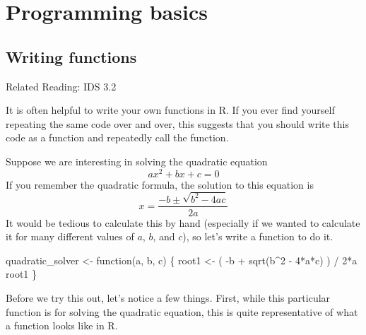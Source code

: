 \documentclass[
  letterpaper,
  DIV=11,
  numbers=noendperiod]{scrreprt}
\newenvironment{Shaded}{\begin{snugshade}}{\end{snugshade}}
\newcommand{\ControlFlowTok}[1]{\textcolor[rgb]{0.00,0.23,0.31}{#1}}
\newcommand{\DecValTok}[1]{\textcolor[rgb]{0.68,0.00,0.00}{#1}}
\newcommand{\FunctionTok}[1]{\textcolor[rgb]{0.28,0.35,0.67}{#1}}
\newcommand{\NormalTok}[1]{\textcolor[rgb]{0.00,0.23,0.31}{#1}}
\newcommand{\OtherTok}[1]{\textcolor[rgb]{0.00,0.23,0.31}{#1}}
\newcommand{\SpecialCharTok}[1]{\textcolor[rgb]{0.37,0.37,0.37}{#1}}
\begin{document}
\section{Programming basics}\label{programming-basics}

\subsection{Writing functions}\label{writing-functions}

Related Reading: IDS 3.2

It is often helpful to write your own functions in R. If you ever find
yourself repeating the same code over and over, this suggests that you
should write this code as a function and repeatedly call the function.

Suppose we are interesting in solving the quadratic equation \[
  ax^2 + bx + c = 0
\] If you remember the quadratic formula, the solution to this equation
is \[
  x = \frac{-b \pm \sqrt{b^2-4ac}}{2a}
\] It would be tedious to calculate this by hand (especially if we
wanted to calculate it for many different values of \(a\), \(b\), and
\(c\)), so let's write a function to do it.

\begin{Shaded}
\begin{Highlighting}[]
\NormalTok{quadratic\_solver }\OtherTok{\textless{}{-}} \ControlFlowTok{function}\NormalTok{(a, b, c) \{}
\NormalTok{  root1 }\OtherTok{\textless{}{-}}\NormalTok{ ( }\SpecialCharTok{{-}}\NormalTok{b }\SpecialCharTok{+} \FunctionTok{sqrt}\NormalTok{(b}\SpecialCharTok{\^{}}\DecValTok{2} \SpecialCharTok{{-}} \DecValTok{4}\SpecialCharTok{*}\NormalTok{a}\SpecialCharTok{*}\NormalTok{c) ) }\SpecialCharTok{/} \DecValTok{2}\SpecialCharTok{*}\NormalTok{a}
\NormalTok{  root1}
\NormalTok{\}}
\end{Highlighting}
\end{Shaded}

Before we try this out, let's notice a few things. First, while this
particular function is for solving the quadratic equation, this is quite
representative of what a function looks like in R.
\end{document}

